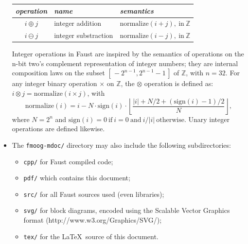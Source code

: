\documentclass{article}
\newcommand{\faustdocdir}{fmoog-mdoc}
\begin{document}
\begin{itemize}
\begin{center}
\begin{tabular}{|c|l|l|}
		\hline 
		\emph{operation} & \emph{name} & \emph{semantics} \\
		\hline 
		$i \oplus j$ & integer addition & $\mathrm{normalize}(i+j), \mathrm{~in~} \mathbb{Z}$ \\
		$i \ominus j$ & integer substraction & $\mathrm{normalize}(i-j), \mathrm{~in~} \mathbb{Z}$ \\
		\hline 
	\end{tabular} 
	\end{center}
		Integer operations in Faust are inspired by the semantics of operations on the n-bit two's complement representation of integer numbers; they are internal composition laws on the subset $[\,-2^{n-1}, 2^{n-1}\!-\!1\,]$ of $\mathbb{Z}$, with $n = 32$. For any integer binary operation $\times$ on $\mathbb{Z}$, the $\otimes$ operation is defined as: $i \otimes j = \mathrm{normalize}(i \times j)$, with 
$$\mathrm{normalize}(i) = i - N\cdot\mathrm{sign}(i) \cdot \left\lfloor \frac{|i|+N/2+(\mathrm{sign}(i)\!-\!1)/2}{N} \right\rfloor , $$
 where $N = 2^n$ and $\mathrm{sign}(i) = 0 \mathrm{\ if\ } i=0 \mathrm{\ and\ } i / |i| \mathrm{\ otherwise}.$
Unary integer operations are defined likewise.
	\item The \texttt{\faustdocdir/} directory may also include the following subdirectories:
\begin{itemize}
	\item	\texttt{cpp/} for Faust compiled code; 
	\item	\texttt{pdf/} which contains this document; 
	\item	\texttt{src/} for all Faust sources used (even libraries); 
	\item	\texttt{svg/} for block diagrams, encoded using the Scalable Vector Graphics format (\textsf{http://www.w3.org/Graphics/SVG/});
	\item	\texttt{tex/} for the \LaTeX\ source of this document.
\end{itemize}
\end{itemize}
\end{document}
